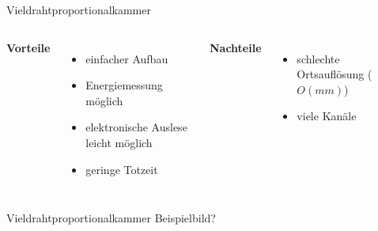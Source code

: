 \begin{frame}{Vieldrahtproportionalkammer}
    \begin{columns}[T]
			\textbf{Vorteile}		
			\begin{itemize}
				\item einfacher Aufbau
			  	\item Energiemessung möglich
			  	\item elektronische Auslese leicht möglich
			  	\item geringe Totzeit 
			\end{itemize}	
	    	\textbf{Nachteile}
	    	\begin{itemize}
			  \item schlechte Ortsauflösung ($O(mm)$)
			  \item viele Kanäle
			\end{itemize}
    \end{columns}
    \vspace{1cm}
\end{frame}

\begin{frame}{Vieldrahtproportionalkammer}
    Beispielbild?
\end{frame}
